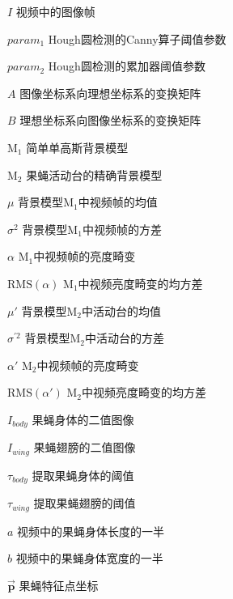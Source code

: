
\begin{denotation}[3cm]
\item[$I$]  视频中的图像帧
\item[$param_1$]  Hough圆检测的Canny算子阈值参数
\item[$param_2$]  Hough圆检测的累加器阈值参数
\item[$A$]  图像坐标系向理想坐标系的变换矩阵
\item[$B$]  理想坐标系向图像坐标系的变换矩阵
\item[$\textrm{M}_1$] 简单单高斯背景模型
\item[$\textrm{M}_2$] 果蝇活动台的精确背景模型
\item[$\mu$]    背景模型$\textrm{M}_1$中视频帧的均值
\item[$\sigma^2$]   背景模型$\textrm{M}_1$中视频帧的方差
\item[$\alpha$] $\textrm{M}_1$中视频帧的亮度畸变
\item[$\textrm{RMS}(\alpha)$] $\textrm{M}_1$中视频亮度畸变的均方差
\item[$\mu'$]   背景模型$\textrm{M}_2$中活动台的均值
\item[$\sigma^{\prime 2}$] 背景模型$\textrm{M}_2$中活动台的方差
\item[$\alpha'$] $\textrm{M}_2$中视频帧的亮度畸变
\item[$\textrm{RMS}(\alpha')$] $\textrm{M}_2$中视频亮度畸变的均方差
\item[$I_{body}$]    果蝇身体的二值图像
\item[$I_{wing}$]    果蝇翅膀的二值图像
\item[$\tau_{body}$] 提取果蝇身体的阈值
\item[$\tau_{wing}$] 提取果蝇翅膀的阈值
\item[$a$]    视频中的果蝇身体长度的一半
\item[$b$]    视频中的果蝇身体宽度的一半
\item[$\vec{\bm p}$]    果蝇特征点坐标
\end{denotation}
